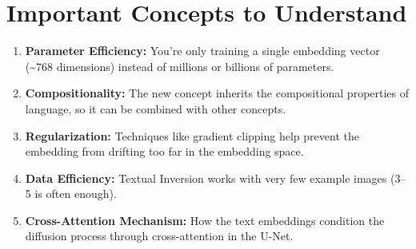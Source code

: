 \section*{Important Concepts to Understand}
\begin{enumerate}
  \item \textbf{Parameter Efficiency:} You're only training a single embedding vector (\textasciitilde768 dimensions) instead of millions or billions of parameters.
  \item \textbf{Compositionality:} The new concept inherits the compositional properties of language, so it can be combined with other concepts.
  \item \textbf{Regularization:} Techniques like gradient clipping help prevent the embedding from drifting too far in the embedding space.
  \item \textbf{Data Efficiency:} Textual Inversion works with very few example images (3--5 is often enough).
  \item \textbf{Cross-Attention Mechanism:} How the text embeddings condition the diffusion process through cross-attention in the U-Net.
\end{enumerate}
